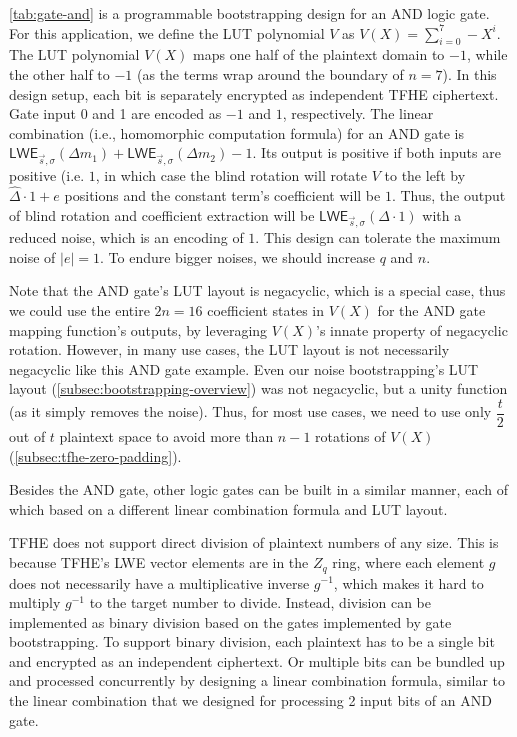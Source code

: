 \autoref{tab:gate-and} is a programmable bootstrapping design for an AND logic gate. For this application, we define the LUT polynomial $V$ as $V(X) = \sum\limits_{i=0}^{7}-X^i$. The LUT polynomial $V(X)$ maps one half of the plaintext domain to $-1$, while the other half to $-1$ (as the terms wrap around the boundary of $n=7$). In this design setup, each bit is separately encrypted as independent TFHE ciphertext. Gate input 0 and 1 are encoded as $-1$ and $1$, respectively. The linear combination (i.e., homomorphic computation formula) for an AND gate is $\textsf{LWE}_{\vec{s}, \sigma}(\Delta m_1) + \textsf{LWE}_{\vec{s}, \sigma}(\Delta m_2) - 1$. Its output is positive if both inputs are positive (i.e. $1$, in which case the blind rotation will rotate $V$ to the left by $\hat\Delta\cdot 1 + e$ positions and the constant term's coefficient will be $1$. Thus, the output of blind rotation and coefficient extraction will be $\textsf{LWE}_{\vec{s}, \sigma}(\Delta \cdot 1)$ with a reduced noise, which is an encoding of $1$. This design can tolerate the maximum noise of $|e| = 1$. To endure bigger noises, we should increase $q$ and $n$. 

Note that the AND gate's LUT layout is negacyclic, which is a special case, thus we could use the entire $2n=16$ coefficient states in $V(X)$ for the AND gate mapping function's outputs, by leveraging $V(X)$'s innate property of negacyclic rotation. However, in many use cases, the LUT layout is not necessarily negacyclic like this AND gate example. Even our noise bootstrapping's LUT layout (\autoref{subsec:bootstrapping-overview}) was not negacyclic, but a unity function (as it simply removes the noise). Thus, for most use cases, we need to use only $\dfrac{t}{2}$ out of $t$ plaintext space to avoid more than $n-1$ rotations of $V(X)$ (\autoref{subsec:tfhe-zero-padding}). 

Besides the AND gate, other logic gates can be built in a similar manner, each of which based on a different linear combination formula and LUT layout. 

 TFHE does not support direct division of plaintext numbers of any size. This is because TFHE's LWE vector elements are in the $Z_q$ ring, where each element $g$ does not necessarily have a multiplicative inverse $g^{-1}$, which makes it hard to multiply $g^{-1}$ to the target number to divide. Instead, division can be implemented as binary division based on the gates implemented by gate bootstrapping. To support binary division, each plaintext has to be a single bit and encrypted as an independent ciphertext. Or multiple bits can be bundled up and processed concurrently by designing a linear combination formula, similar to the linear combination that we designed for processing 2 input bits of an AND gate.

